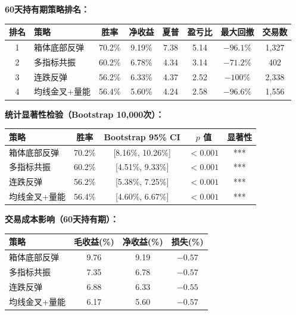 \documentclass[12pt,a4paper]{ctexart}
\numberwithin{figure}{section}
\numberwithin{table}{section}
\begin{document}
\vspace{0.3cm}
\noindent\textbf{60天持有期策略排名：}
\begin{center}
\small
\begin{tabularx}{\textwidth}{c l c c c c c c}
\toprule
排名 & 策略 & 胜率 & 净收益 & 夏普 & 盈亏比 & 最大回撤 & 交易数 \\
\midrule
1 & 箱体底部反弹 & 70.2\% & 9.19\% & 7.38 & 5.14 & $-96.1$\% & 1,327 \\
2 & 多指标共振 & 60.2\% & 6.78\% & 4.34 & 3.14 & $-71.2$\% & 402 \\
3 & 连跌反弹 & 56.2\% & 6.33\% & 4.37 & 2.52 & $-100$\% & 2,338 \\
4 & 均线金叉+量能 & 56.4\% & 5.60\% & 4.24 & 2.58 & $-96.6$\% & 1,556 \\
\bottomrule
\end{tabularx}
\end{center}

\vspace{0.3cm}
\noindent\textbf{统计显著性检验（Bootstrap 10,000次）：}
\begin{center}
\small
\begin{tabularx}{\textwidth}{l c c c c}
\toprule
策略 & 胜率 & Bootstrap 95\% CI & $p$ 值 & 显著性 \\
\midrule
箱体底部反弹 & 70.2\% & [8.16\%, 10.26\%] & $<0.001$ & *** \\
多指标共振 & 60.2\% & [4.51\%, 9.33\%] & $<0.001$ & *** \\
连跌反弹 & 56.2\% & [5.38\%, 7.25\%] & $<0.001$ & *** \\
均线金叉+量能 & 56.4\% & [4.60\%, 6.67\%] & $<0.001$ & *** \\
\bottomrule
\end{tabularx}
\end{center}

\noindent\textbf{交易成本影响（60天持有期）：}
\begin{center}
\small
\begin{tabularx}{\textwidth}{l c c c}
\toprule
策略 & 毛收益(\%) & 净收益(\%) & 损失(\%) \\
\midrule
箱体底部反弹 & 9.76 & 9.19 & $-0.57$ \\
多指标共振 & 7.35 & 6.78 & $-0.57$ \\
连跌反弹 & 6.88 & 6.33 & $-0.55$ \\
均线金叉+量能 & 6.17 & 5.60 & $-0.57$ \\
\bottomrule
\end{tabularx}
\end{center}
\end{document}
